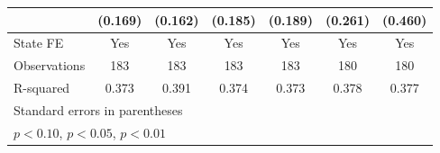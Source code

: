 {\begin{tabular}{l*{6}{c}}
                    &     (0.169)         &     (0.162)         &     (0.185)         &     (0.189)         &     (0.261)         &     (0.460)         \\
\midrule
State FE            &         Yes         &         Yes         &         Yes         &         Yes         &         Yes         &         Yes         \\
Observations        &         183         &         183         &         183         &         183         &         180         &         180         \\
R-squared           &       0.373         &       0.391         &       0.374         &       0.373         &       0.378         &       0.377         \\
\bottomrule
\multicolumn{7}{l}{\footnotesize Standard errors in parentheses}\\
\multicolumn{7}{l}{\footnotesize \sym{*} \(p<0.10\), \sym{**} \(p<0.05\), \sym{***} \(p<0.01\)}\\
\end{tabular}
}
